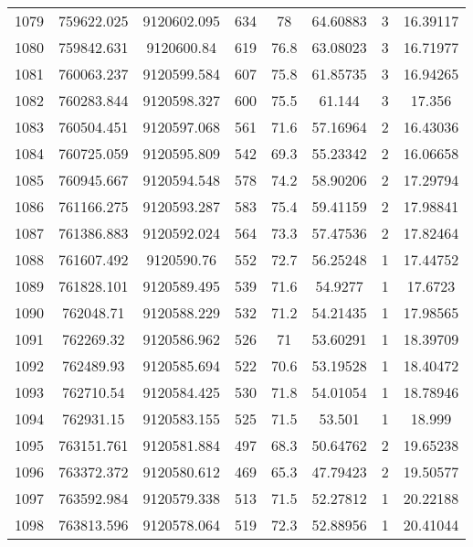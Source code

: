 \begin{longtable}{cccccccc}
1079 & 759622.025      & 9120602.095      & 634     & 78    & 64.60883 & 3  & 16.39117 \\
1080 & 759842.631      & 9120600.84       & 619     & 76.8  & 63.08023 & 3  & 16.71977 \\
1081 & 760063.237      & 9120599.584      & 607     & 75.8  & 61.85735 & 3  & 16.94265 \\
1082 & 760283.844      & 9120598.327      & 600     & 75.5  & 61.144   & 3  & 17.356   \\
1083 & 760504.451      & 9120597.068      & 561     & 71.6  & 57.16964 & 2  & 16.43036 \\
1084 & 760725.059      & 9120595.809      & 542     & 69.3  & 55.23342 & 2  & 16.06658 \\
1085 & 760945.667      & 9120594.548      & 578     & 74.2  & 58.90206 & 2  & 17.29794 \\
1086 & 761166.275      & 9120593.287      & 583     & 75.4  & 59.41159 & 2  & 17.98841 \\
1087 & 761386.883      & 9120592.024      & 564     & 73.3  & 57.47536 & 2  & 17.82464 \\
1088 & 761607.492      & 9120590.76       & 552     & 72.7  & 56.25248 & 1  & 17.44752 \\
1089 & 761828.101      & 9120589.495      & 539     & 71.6  & 54.9277  & 1  & 17.6723  \\
1090 & 762048.71       & 9120588.229      & 532     & 71.2  & 54.21435 & 1  & 17.98565 \\
1091 & 762269.32       & 9120586.962      & 526     & 71    & 53.60291 & 1  & 18.39709 \\
1092 & 762489.93       & 9120585.694      & 522     & 70.6  & 53.19528 & 1  & 18.40472 \\
1093 & 762710.54       & 9120584.425      & 530     & 71.8  & 54.01054 & 1  & 18.78946 \\
1094 & 762931.15       & 9120583.155      & 525     & 71.5  & 53.501   & 1  & 18.999   \\
1095 & 763151.761      & 9120581.884      & 497     & 68.3  & 50.64762 & 2  & 19.65238 \\
1096 & 763372.372      & 9120580.612      & 469     & 65.3  & 47.79423 & 2  & 19.50577 \\
1097 & 763592.984      & 9120579.338      & 513     & 71.5  & 52.27812 & 1  & 20.22188 \\
1098 & 763813.596      & 9120578.064      & 519     & 72.3  & 52.88956 & 1  & 20.41044 \\

\end{longtable}
